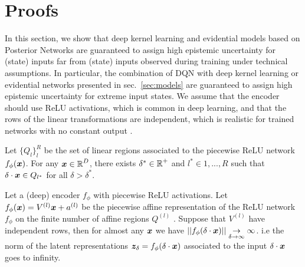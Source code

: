 \appendix


\section{Proofs}
\label{app:proofs}

In this section, we show that deep kernel learning \cite{due} and evidential models based on Posterior Networks \cite{postnet, natpn}  are guaranteed to assign high epistemic uncertainty for (state) inputs far from (state) inputs observed during training under technical assumptions. In particular, the combination of DQN with deep kernel learning or evidential networks presented in sec.~\ref{sec:models} are guaranteed to assign high epistemic uncertainty for extreme input states. We assume that the encoder should use ReLU activations, which is common in deep learning, and that the rows of the linear transformations are independent, which is realistic for trained networks with no constant output \citep{overconfident-relu}.

\begin{lemma}
\label{lem:relu-regions}
\cite{understanding-nn-relu} Let $\{Q_l\}_l^{R}$ be the set of linear regions associated to the piecewise ReLU network $f_{\phi}(\bm{x})$. For any $\bm{x} \in \operatorname{\mathbb{R}}^D$, there exists $\delta^* \in \operatorname{\mathbb{R}}^{+}$ and $l^*\in {1,..., R}$ such that $\delta \cdot \bm{x} \in Q_{l^*}$ for all $\delta > \delta^*$.
\end{lemma}

\begin{lemma}
\label{lem:asymptotic-latent-norm}
Let a (deep) encoder $f_{\phi}$ with piecewise ReLU activations. Let $f_{\phi}(\bm{x})= V^{(l)}\bm{x} + a^{(l)}$ be the piecewise affine representation of the ReLU network $f_{\phi}$ on the finite number of affine regions $Q^{(l)}$ \citep{understanding-nn-relu}. Suppose that $V^{(l)}$ have independent rows, then for almost any $\bm{x}$ we have $|| f_{\phi}(\delta \cdot \bm{x}) || \underset{\delta \rightarrow \infty}{\rightarrow} \infty$. i.e the norm of the latent representations $\bm{z}_\delta=f_{\phi}(\delta \cdot \bm{x})$ associated to the input $\delta \cdot \bm{x}$ goes to infinity.
\end{lemma}

